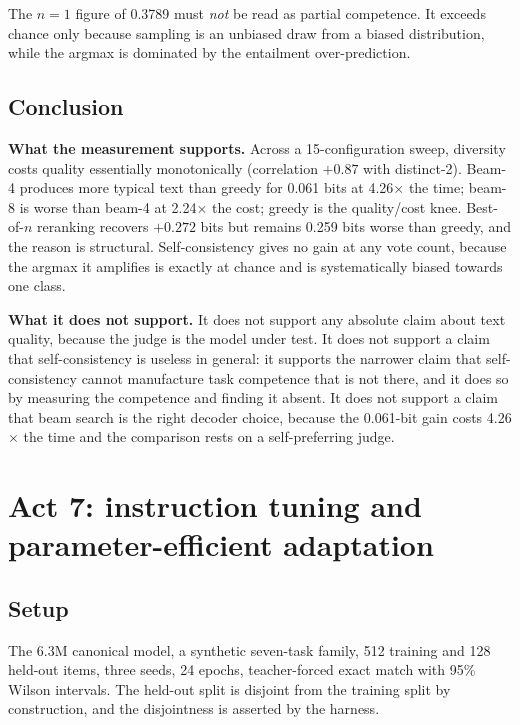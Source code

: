 \documentclass[11pt,a4paper]{article}
\begin{document}
The $n = 1$ figure of 0.3789 must \emph{not} be read as partial competence. %
 It
exceeds chance only because sampling is an unbiased draw from a biased
distribution, while the argmax is dominated by the entailment over-prediction.

\subsection{Conclusion}
\label{sec:act6-conclusion}

\textbf{What the measurement supports.} Across a 15-configuration sweep,
diversity costs quality essentially monotonically (correlation $+0.87$ with
distinct-2). Beam-4 produces more typical text than greedy for 0.061 bits at
4.26$\times$ the time; beam-8 is worse than beam-4 at 2.24$\times$ the cost;
greedy is the quality/cost knee. Best-of-$n$ reranking recovers $+0.272$ bits
but remains 0.259 bits worse than greedy, and the reason is structural.
Self-consistency gives no gain at any vote count, because the argmax it
amplifies is exactly at chance and is systematically biased towards one class.

\textbf{What it does not support.} It does not support any absolute claim
about text quality, because the judge is the model under test. It does not
support a claim that self-consistency is useless in general: it supports the
narrower claim that self-consistency cannot manufacture task competence that
is not there, and it does so by measuring the competence and finding it
absent. It does not support a claim that beam search is the right decoder
choice, because the 0.061-bit gain costs 4.26$\times$ the time and the
comparison rests on a self-preferring judge.

\section{Act 7: instruction tuning and parameter-efficient adaptation}
\label{sec:act7}

\subsection{Setup}
\label{sec:act7-setup}

The 6.3M canonical model, a synthetic seven-task family, 512 training and 128
held-out items, three seeds, 24 epochs, teacher-forced exact match with 95\%
Wilson intervals. The held-out split is disjoint from the training split by
construction, and the disjointness is asserted by the harness.
\end{document}
